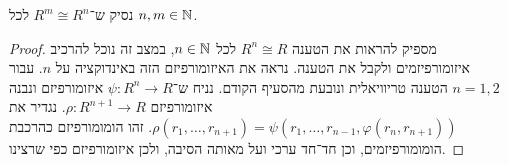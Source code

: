 \subquestion{}
נסיק ש־$R^m \cong R^n$ לכל $n, m \in \mathbb{N}$.
\begin{proof}
	מספיק להראות את הטענה $R^n \cong R$ לכל $n \in \mathbb{N}$, במצב זה נוכל להרכיב איזומורפיזמים ולקבל את הטענה.
	נראה את האיזומורפיזם הזה באינדוקציה על $n$.
	עבור $n = 1, 2$ הטענה טריוויאלית ונובעת מהסעיף הקודם.
	נניח ש־$\psi : R^n \to R$ איזומורפיזם ונבנה איזומורפיזם $\rho : R^{n + 1} \to R$.
	נגדיר את $\rho(r_1, \ldots, r_{n + 1}) = \psi(r_1, \ldots, r_{n - 1}, \varphi(r_n, r_{n + 1}))$.
	זהו הומומורפיזם כהרכבת הומומורפיזמים, וכן חד־חד ערכי ועל מאותה הסיבה, ולכן איזומורפיזם כפי שרצינו.
\end{proof}


